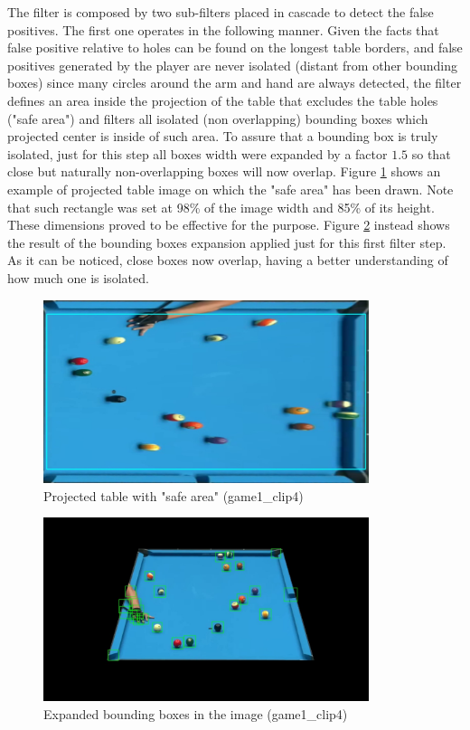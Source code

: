 The filter is composed by two sub-filters placed in cascade to detect the false positives.
The first one operates in the following manner. Given the facts that false positive relative to holes can be found on the longest table
borders, and false positives generated by the player are never isolated (distant from other bounding boxes) since
many circles around the arm and hand are always detected, the filter defines an area inside the projection of the table that excludes
the table holes ("safe area") and filters all isolated (non overlapping) bounding boxes which projected center is inside of such area.
To assure that a bounding box is truly isolated, just for this step all boxes width were expanded by a factor $1.5$ so that close but naturally
non-overlapping boxes will now overlap. Figure \ref{fig:safe_area} shows an example of projected table image on which the "safe area" has been drawn.
Note that such rectangle was set at 98\% of the image width and 85\% of its height. These dimensions proved to be effective for the purpose. 
Figure \ref{fig:exp_bboxes} instead shows the result of the bounding boxes expansion applied just for this first filter step. As it can be noticed, close
boxes now overlap, having a better understanding of how much one is isolated.
\begin{figure}[h!]
    \centering
    \includegraphics[width=0.85\textwidth]{imgs/ball_localization/safe_area.jpg}
    \caption{Projected table with "safe area" (game1\_clip4)}
    \label{fig:safe_area}
\end{figure}
\begin{figure}[h!]
    \centering
    \includegraphics[width=0.85\textwidth]{imgs/ball_localization/exp_boxes_filter.jpg}
    \caption{Expanded bounding boxes in the image (game1\_clip4)}
    \label{fig:exp_bboxes}
\end{figure}

